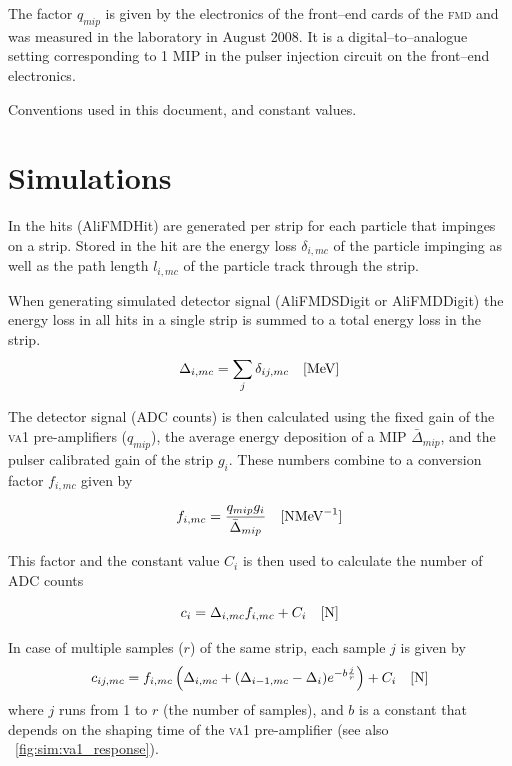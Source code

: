 \documentclass[11pt]{article}
\def\MeV#1{\unit[#1]{MeV}}
\def\N#1{\unit[#1]{N}}
\def\FMD{{\scshape fmd}}
\def\VA{{\scshape va1}}
\def\class#1{{\small\ttfamily #1}}
\def\DeltaMip{\ensuremath{\bar{\Delta}_{mip}}}
\begin{document}
\begin{table}[Htbp]
  The factor $q_{mip}$ is given by the electronics of the front--end
  cards of the \FMD{} and was measured in the laboratory in August 2008.
  It is a digital--to--analogue setting corresponding to 1 MIP in the
  pulser injection circuit on the front--end electronics. 
  \caption{Conventions used in this document, and constant values.}
  \label{tab:conventions}
\end{table}


\section*{Simulations}

In the hits (\class{AliFMDHit}) are generated per strip for each
particle that impinges on a strip.  Stored in the hit are the energy
loss $\delta_{i,mc}$ of the particle impinging as well as the path
length $l_{i,mc}$ of the particle track through the strip.  

When generating simulated detector signal (\class{AliFMDSDigit} or
\class{AliFMDDigit}) the energy loss in all hits in a single strip is
summed to a total energy loss in the strip. 
\begin{equation}
  \label{eq:sim:sum_eloss}
  \Delta_{i,mc} = \sum_j \delta_{ij,mc} \quad[\MeV{}]
\end{equation}

The detector signal (ADC counts) is then calculated using the fixed
gain of the \VA{} pre-amplifiers ($q_{mip}$), the average
energy deposition of a MIP $\DeltaMip{}$, and the pulser calibrated
gain of the strip $g_i$.   These numbers combine to a conversion
factor $f_{i,mc}$ given by 

\begin{equation}
  \label{eq:sim:conversion_factor}
  f_{i,mc} = \frac{q_{mip} g_i}{\DeltaMip{}} \quad [\N{} \MeV{}^{-1}]
\end{equation}

This factor and the constant value $C_i$ is then used to calculate the
number of ADC counts 

\begin{equation}
  \label{eq:sim:adc_counts}
  c_i = \Delta_{i,mc} f_{i,mc} + C_i \quad[\N{}]
\end{equation}

In case of multiple samples ($r$) of the same strip, each sample $j$ is
given by
\begin{equation}
  \label{eq:sim:sub_adc_counts}
  c_{ij,mc} = f_{i,mc} \left(\Delta_{i,mc} + (\Delta_{i-1,mc}-\Delta_i) e^{-b
      \frac{j}{r}}\right)+C_i \quad[\N{}]
\end{equation}
where $j$ runs from 1 to $r$ (the number of samples), and $b$ is a
constant that depends on the shaping time of the \VA{}
pre-amplifier (see also \figurename~\ref{fig:sim:va1_response}). 
\end{document}
